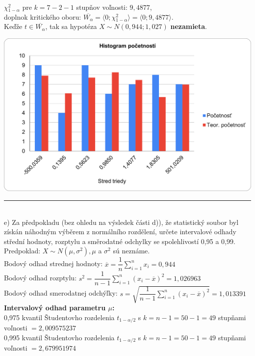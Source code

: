 \documentclass[pdftex, 11pt, a4paper, titlepage]{article}
\begin{document}
    \noindent
    $ \chi{}_{1-\alpha}^2 $ pre $ k = 7-2-1 $ stupňov voľnosti: $ 9,4877 $,\\

    \noindent
    doplnok kritického oboru: $ \overline{W_\alpha} = \langle 0;\chi{}_{1-\alpha}^2 \rangle = \langle 0;9,4877 \rangle $.\\

    \noindent
    Keďže $ t \in \overline{W_\alpha} $, tak sa hypotéza $ X \sim N(0,944; 1,027) $ \textbf{nezamieta}.

    \includegraphics[scale=0.8]{histogram_pocetnosti.png}

    \newpage
    \noindent\rule{\linewidth}{0.4pt}\\

    \noindent
    e) Za předpokladu (bez ohledu na výsledek části d)), že statistický soubor
    byl získán náhodným výběrem z normálního rozdělení, určete intervalové odhady
    střední hodnoty, rozptylu a směrodatné odchylky se spolehlivostí 0,95 a 0,99.\\

    \noindent
    Predpoklad: $ X \sim N(\mu,\sigma^2), \mu $ a $ \sigma^2 $ sú neznáme.\\

    \noindent
    Bodový odhad strednej hodnoty: $ \overline{x} = \dfrac{1}{n} \sum\limits_{i=1}^{n} x_i = 0,944 $ \\
    Bodový odhad rozptylu: $ s^2 = \dfrac{1}{n-1} \sum\limits_{i=1}^{n} (x_i - \overline{x})^2 = 1,026963 $ \\
    Bodový odhad smerodatnej odchýľky: $ s = \sqrt{\dfrac{1}{n-1} \sum\limits_{i=1}^{n} (x_i - \overline{x})^2} = 1,013391 $ \\

    \noindent
    \textbf{Intervalový odhad parametru $\mu$:}\\
    0,975 kvantil Študentovho rozdelenia $t_{1-\alpha/2}$ s $k=n-1=50-1=49$
    stupňami voľnosti $=2,009575237$\\
    0,995 kvantil Študentovho rozdelenia $t_{1-\alpha/2}$ s $k=n-1=50-1=49$
    stupňami voľnosti $=2,679951974$\\
\end{document}
